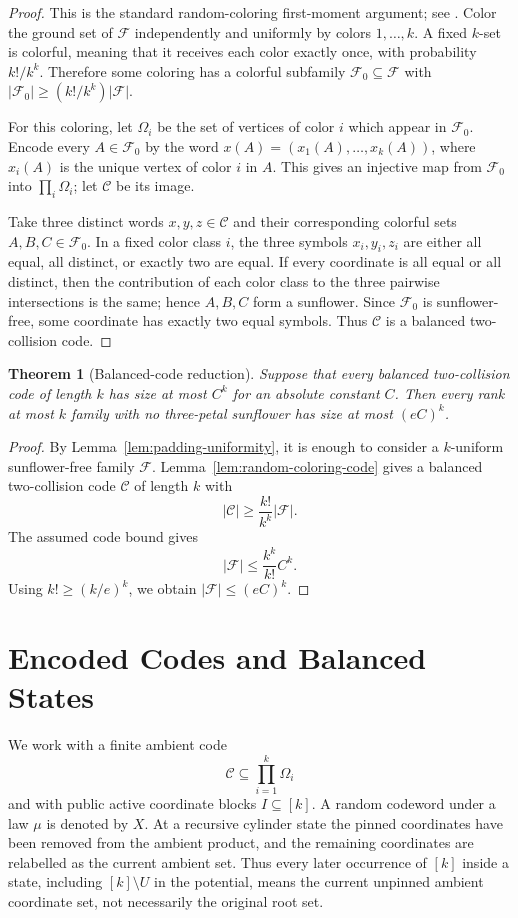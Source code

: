 \documentclass[11pt]{article}
\newtheorem{theorem}{Theorem}[section]
\newcommand{\C}{\mathcal C}
\newcommand{\F}{\mathcal F}
\begin{document}
\begin{proof}
This is the standard random-coloring first-moment argument; see
\cite{AlonSpencer16}.
Color the ground set of $\F$ independently and uniformly by colors
$1,\ldots,k$.  A fixed $k$-set is colorful, meaning that it receives each
color exactly once, with probability $k!/k^k$.  Therefore some coloring has a
colorful subfamily $\F_0\subseteq\F$ with
$|\F_0|\ge (k!/k^k)|\F|$.

For this coloring, let $\Omega_i$ be the set of vertices of color $i$ which
appear in $\F_0$.  Encode every $A\in\F_0$ by the word
$x(A)=(x_1(A),\ldots,x_k(A))$, where $x_i(A)$ is the unique vertex of color
$i$ in $A$.  This gives an injective map from $\F_0$ into
$\prod_i\Omega_i$; let $\C$ be its image.

Take three distinct words $x,y,z\in\C$ and their corresponding colorful sets
$A,B,C\in\F_0$.  In a fixed color class $i$, the three symbols
$x_i,y_i,z_i$ are either all equal, all distinct, or exactly two are equal.
If every coordinate is all equal or all distinct, then the contribution of
each color class to the three pairwise intersections is the same; hence
$A,B,C$ form a sunflower.  Since $\F_0$ is sunflower-free, some coordinate
has exactly two equal symbols.  Thus $\C$ is a balanced two-collision code.
\end{proof}

\begin{theorem}[Balanced-code reduction]
\label{thm:balanced-code-reduction}
Suppose that every balanced two-collision code of length $k$ has size at most
$C^k$ for an absolute constant $C$.  Then every rank at most $k$ family with
no three-petal sunflower has size at most $(eC)^k$.
\end{theorem}

\begin{proof}
By Lemma~\ref{lem:padding-uniformity}, it is enough to consider a
$k$-uniform sunflower-free family $\F$.  Lemma~\ref{lem:random-coloring-code}
gives a balanced two-collision code $\C$ of length $k$ with
\[
  |\C|\ge \frac{k!}{k^k}|\F|.
\]
The assumed code bound gives
\[
  |\F|\le \frac{k^k}{k!}C^k.
\]
Using $k!\ge (k/e)^k$, we obtain $|\F|\le (eC)^k$.
\end{proof}

\section{Encoded Codes and Balanced States}

We work with a finite ambient code
\[
  \C \subseteq \prod_{i=1}^k\Omega_i
\]
and with public active coordinate blocks $I\subseteq [k]$.  A random codeword
under a law $\mu$ is denoted by $X$.
At a recursive cylinder state the pinned coordinates have been removed from
the ambient product, and the remaining coordinates are relabelled as the
current ambient set.  Thus every later occurrence of $[k]$ inside a state,
including $[k]\setminus U$ in the potential, means the current unpinned ambient
coordinate set, not necessarily the original root set.
\end{document}
